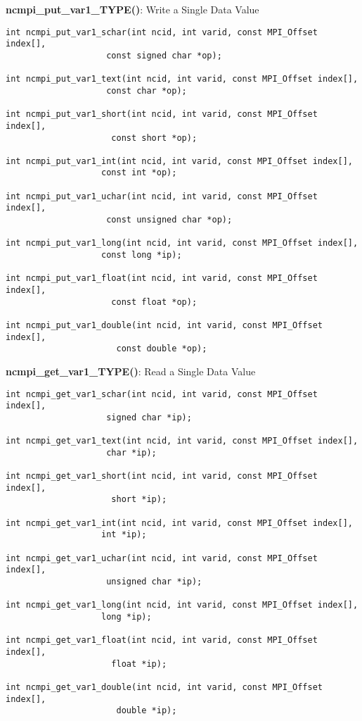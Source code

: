{\bf ncmpi\_put\_var1\_TYPE()}: Write a Single Data Value

\begin{verbatim}
int ncmpi_put_var1_schar(int ncid, int varid, const MPI_Offset index[],
                    const signed char *op);

int ncmpi_put_var1_text(int ncid, int varid, const MPI_Offset index[],
                    const char *op);

int ncmpi_put_var1_short(int ncid, int varid, const MPI_Offset index[],
                     const short *op);

int ncmpi_put_var1_int(int ncid, int varid, const MPI_Offset index[],
                   const int *op);

int ncmpi_put_var1_uchar(int ncid, int varid, const MPI_Offset index[],
                    const unsigned char *op);

int ncmpi_put_var1_long(int ncid, int varid, const MPI_Offset index[],
                   const long *ip);

int ncmpi_put_var1_float(int ncid, int varid, const MPI_Offset index[],
                     const float *op);

int ncmpi_put_var1_double(int ncid, int varid, const MPI_Offset index[],
                      const double *op);
\end{verbatim}


{\bf ncmpi\_get\_var1\_TYPE()}: Read a Single Data Value

\begin{verbatim}
int ncmpi_get_var1_schar(int ncid, int varid, const MPI_Offset index[],
                    signed char *ip);

int ncmpi_get_var1_text(int ncid, int varid, const MPI_Offset index[],
                    char *ip);

int ncmpi_get_var1_short(int ncid, int varid, const MPI_Offset index[],
                     short *ip);

int ncmpi_get_var1_int(int ncid, int varid, const MPI_Offset index[],
                   int *ip);

int ncmpi_get_var1_uchar(int ncid, int varid, const MPI_Offset index[],
                    unsigned char *ip);

int ncmpi_get_var1_long(int ncid, int varid, const MPI_Offset index[],
                   long *ip);

int ncmpi_get_var1_float(int ncid, int varid, const MPI_Offset index[],
                     float *ip);

int ncmpi_get_var1_double(int ncid, int varid, const MPI_Offset index[],
                      double *ip);
\end{verbatim}


